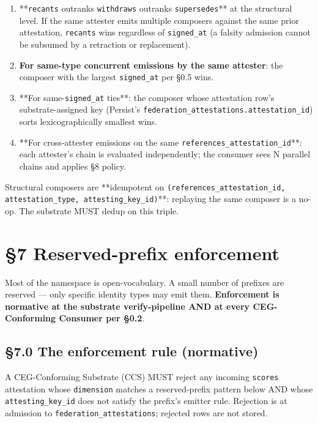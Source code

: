 \documentclass[11pt]{article}
\begin{document}
\begin{enumerate}\setlength\itemsep{0pt}
\item **\texttt{recants} outranks \texttt{withdraws} outranks \texttt{supersedes}** at the structural level. If the same attester emits multiple composers against the same prior attestation, \texttt{recants} wins regardless of \texttt{signed\_at} (a falsity admission cannot be subsumed by a retraction or replacement).
\item \textbf{For same-type concurrent emissions by the same attester}: the composer with the largest \texttt{signed\_at} per §0.5 wins.
\item **For same-\texttt{signed\_at} ties**: the composer whose attestation row's substrate-assigned key (Persist's \texttt{federation\_attestations.attestation\_id}) sorts lexicographically smallest wins.
\item **For cross-attester emissions on the same \texttt{references\_attestation\_id}**: each attester's chain is evaluated independently; the consumer sees N parallel chains and applies §8 policy.
\end{enumerate}


Structural composers are **idempotent on \texttt{(references\_attestation\_id, attestation\_type, attesting\_key\_id)}**: replaying the same composer is a no-op. The substrate MUST dedup on this triple.




\clearpage


\section*{§7 Reserved-prefix enforcement}


Most of the namespace is open-vocabulary. A small number of prefixes are reserved — only specific identity types may emit them. \textbf{Enforcement is normative at the substrate verify-pipeline AND at every CEG-Conforming Consumer per §0.2}.


\subsection*{§7.0 The enforcement rule (normative)}


A CEG-Conforming Substrate (CCS) MUST reject any incoming \texttt{scores} attestation whose \texttt{dimension} matches a reserved-prefix pattern below AND whose \texttt{attesting\_key\_id} does not satisfy the prefix's emitter rule. Rejection is at admission to \texttt{federation\_attestations}; rejected rows are not stored.
\end{document}
